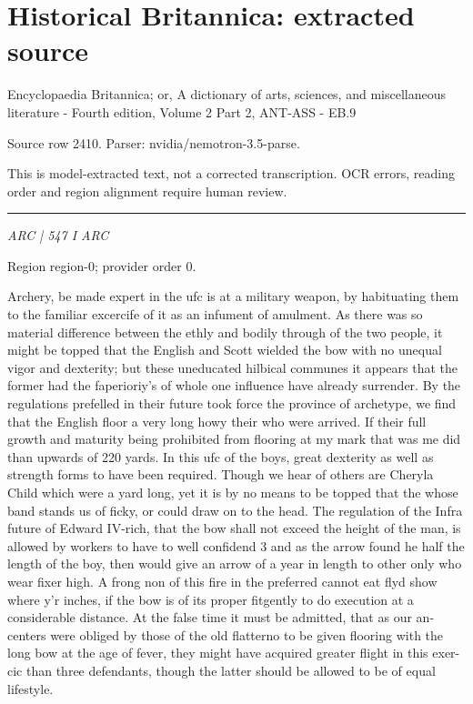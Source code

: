 \documentclass[11pt]{article}
\begin{document}
\section*{Historical Britannica: extracted source}
Encyclopaedia Britannica; or, A dictionary of arts, sciences, and miscellaneous literature - Fourth edition, Volume 2 Part 2, ANT-ASS - EB.9\par
{\small Source row 2410. Parser: nvidia/nemotron-3.5-parse.\par}
{\small This is model-extracted text, not a corrected transcription. OCR errors, reading order and region alignment require human review.\par}
\hrule\medskip
{\small\itshape ARC | 547 I ARC\par}

{\scriptsize\color{gray} Region region-0; provider order 0.\par}
\medskip

Archery, be made expert in the ufc is at a military weapon, by habituating them to the familiar excercife of it as an infument of amulment. As there was so material difference between the ethly and bodily through of the two people, it might be topped that the English and Scott wielded the bow with no unequal vigor and dexterity; but these uneducated hilbical communes it appears that the former had the faperioriy’s of whole one influence have already surrender. By the regulations prefelled in their future took force the province of archetype, we find that the English floor a very long howy their who were arrived. If their full growth and maturity being prohibited from flooring at my mark that was me did than upwards of 220 yards. In this ufc of the boys, great dexterity as well as strength forms to have been required. Though we hear of others are Cheryla Child which were a yard long, yet it is by no means to be topped that the whose band stands us of ficky, or could draw on to the head. The regulation of the Infra future of Edward IV-rich, that the bow shall not exceed the height of the man, is allowed by workers to have to well confidend 3 and as the arrow found he half the length of the boy, then would give an arrow of a year in length to other only who wear fixer high. A frong non of this fire in the preferred cannot eat flyd show where y'r inches, if the bow is of its proper fitgently to do execution at a considerable distance. At the false time it must be admitted, that as our an- centers were obliged by those of the old flatterno to be given flooring with the long bow at the age of fever, they might have acquired greater flight in this exer- cic than three defendants, though the latter should be allowed to be of equal lifestyle.
\par
\end{document}

